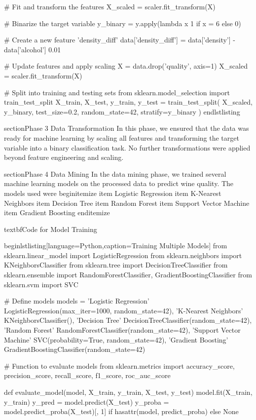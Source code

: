 # Fit and transform the features
X_scaled = scaler.fit_transform(X)

# Binarize the target variable
y_binary = y.apply(lambda x 1 if x = 6 else 0)

# Create a new feature 'density_diff'
data['density_diff'] = data['density'] - data['alcohol']  0.01

# Update features and apply scaling
X = data.drop('quality', axis=1)
X_scaled = scaler.fit_transform(X)

# Split into training and testing sets
from sklearn.model_selection import train_test_split
X_train, X_test, y_train, y_test = train_test_split(
    X_scaled, y_binary, test_size=0.2, random_state=42, stratify=y_binary
)
end{lstlisting}

section{Phase 3 Data Transformation}
In this phase, we ensured that the data was ready for machine learning by scaling all features and transforming the target variable into a binary classification task. No further transformations were applied beyond feature engineering and scaling.

section{Phase 4 Data Mining}
In the data mining phase, we trained several machine learning models on the processed data to predict wine quality. The models used were
begin{itemize}
    item Logistic Regression
    item K-Nearest Neighbors
    item Decision Tree
    item Random Forest
    item Support Vector Machine
    item Gradient Boosting
end{itemize}

textbf{Code for Model Training}

begin{lstlisting}[language=Python,caption=Training Multiple Models]
from sklearn.linear_model import LogisticRegression
from sklearn.neighbors import KNeighborsClassifier
from sklearn.tree import DecisionTreeClassifier
from sklearn.ensemble import RandomForestClassifier, GradientBoostingClassifier
from sklearn.svm import SVC

# Define models
models = {
    'Logistic Regression' LogisticRegression(max_iter=1000, random_state=42),
    'K-Nearest Neighbors' KNeighborsClassifier(),
    'Decision Tree' DecisionTreeClassifier(random_state=42),
    'Random Forest' RandomForestClassifier(random_state=42),
    'Support Vector Machine' SVC(probability=True, random_state=42),
    'Gradient Boosting' GradientBoostingClassifier(random_state=42)
}

# Function to evaluate models
from sklearn.metrics import accuracy_score, precision_score, recall_score, f1_score, roc_auc_score

def evaluate_model(model, X_train, y_train, X_test, y_test)
    model.fit(X_train, y_train)
    y_pred = model.predict(X_test)
    y_proba = model.predict_proba(X_test)[, 1] if hasattr(model, predict_proba) else None

